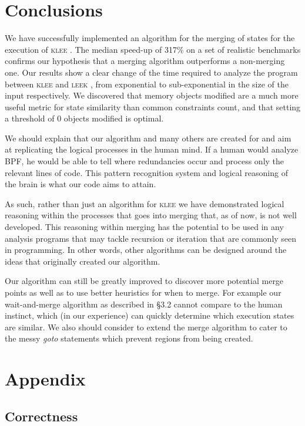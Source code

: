 \documentclass[12pt,a4paper]{article}
\newcommand{\klee}{\textsc{klee }}
\newcommand{\leek}{\textsc{leek }}
\begin{document}
\section*{Conclusions}\label{conclusions}
We have successfully implemented an algorithm for the merging of states for the execution of \klee. The median speed-up of 317\% on a set of realistic benchmarks confirms our hypothesis that a merging algorithm outperforms a non-merging one. Our results show a clear change of the time required to analyze the program between \klee and \leek, from exponential to sub-exponential in the size of the input respectively. We discovered that memory objects modified are a much more useful metric for state similarity than common constraints count, and that setting a threshold of 0 objects modified is optimal.

We should explain that our algorithm and many others are created for and aim at replicating the logical processes in the human mind. If a human would analyze BPF, he would be able to tell where redundancies occur and process only the relevant lines of code. This pattern recognition system and logical reasoning of the brain is what our code aims to attain.

As such, rather than just an algorithm for \klee we have demonstrated logical reasoning within the processes that goes into merging that, as of now, is not well developed. This reasoning within merging has the potential to be used in any analysis programs that may tackle recursion or iteration that are commonly seen in programming. In other words, other algorithms can be designed around the ideas that originally created our algorithm.

Our algorithm can still be greatly improved to discover more potential merge points as well as to use better heuristics for when to merge. For example our wait-and-merge algorithm as described in \S 3.2 cannot compare to the human instinct, which (in our experience) can quickly determine which execution states are similar. We also should consider to extend the merge algorithm to cater to the messy \emph{goto} statements which prevent regions from being created. 

\section*{Appendix}

\subsection*{Correctness}
\end{document}
